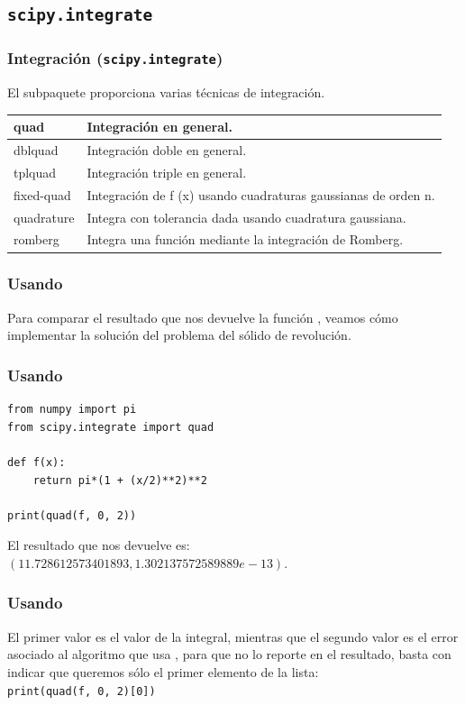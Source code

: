 \documentclass[12pt]{beamer}
\begin{document}
\subsection{\texttt{scipy.integrate}}

\begin{frame}
\frametitle{Integración (\texttt{scipy.integrate})}
El subpaquete  proporciona varias técnicas de integración.
\pause
\fontsize{12}{12}\selectfont
\begin{table}
\renewcommand{\arraystretch}{0.9}
\begin{tabular}{l | p{8cm}}
quad 		& Integración en general. \\ \hline
dblquad 	& Integración doble en general. \\ \hline
tplquad 	& Integración triple en general. \\ \hline
fixed-quad 	& Integración de f (x) usando cuadraturas gaussianas de orden n. \\ \hline
quadrature 	& Integra con tolerancia dada usando cuadratura gaussiana. \\ \hline
romberg 	& Integra una función mediante la integración de Romberg.
\end{tabular}
\end{table}
\end{frame}
\begin{frame}[fragile]
\frametitle{Usando }
Para comparar el resultado que nos devuelve la función , veamos cómo implementar la solución del problema del sólido de revolución.
\end{frame}
\begin{frame}[fragile]
\frametitle{Usando }
\begin{lstlisting}[caption=Integración con scipy]
from numpy import pi
from scipy.integrate import quad

def f(x):
    return pi*(1 + (x/2)**2)**2
   
print(quad(f, 0, 2))
\end{lstlisting}
\pause
El resultado que nos devuelve es: $(11.728612573401893, 1.302137572589889e-13)$.
\end{frame}
\begin{frame}[fragile]
\frametitle{Usando }
El \textcolor{burntumber}{primer valor es el valor de la integral}, mientras que el \textcolor{carnelian}{segundo valor es el error} asociado al algoritmo que usa , para que no lo reporte en el resultado, basta con indicar que queremos sólo el primer elemento de la lista:
\\
\bigskip
\pause
\verb|print(quad(f, 0, 2)[0])|
\end{frame}
\end{document}
